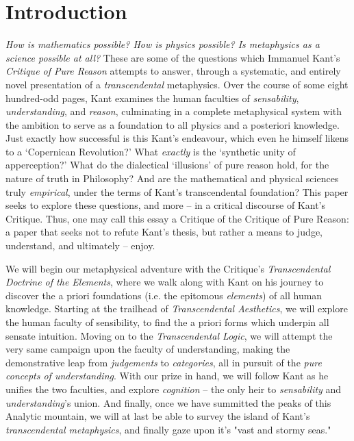 \section*{Introduction}
\emph{How is mathematics possible? How is physics possible? Is metaphysics as a science possible at all?} These are some of the questions which Immanuel Kant's \emph{Critique of Pure Reason} attempts to answer, through a systematic, and entirely novel presentation of a \emph{transcendental} metaphysics. Over the course of some eight hundred-odd pages, Kant examines the human faculties of \emph{sensability}, \emph{understanding}, and \emph{reason}, culminating in a complete metaphysical system with the ambition to serve as a foundation to all physics and a posteriori knowledge. Just exactly how successful is this Kant's endeavour, which even he himself likens to a `Copernican Revolution?' What \emph{exactly} is the `synthetic unity of apperception?' What do the dialectical `illusions' of pure reason hold, for the nature of truth in Philosophy? And are the mathematical and physical sciences truly \emph{empirical}, under the terms of Kant's transcendental foundation? This paper seeks to explore these questions, and more -- in a critical discourse of Kant's Critique. Thus, one may call this essay a Critique of the Critique of Pure Reason: a paper that seeks not to refute Kant's thesis, but rather a means to judge, understand, and ultimately -- enjoy.

We will begin our metaphysical adventure with the Critique's \emph{Transcendental Doctrine of the Elements}, where we walk along with Kant on his journey to discover the a priori foundations (i.e. the epitomous \emph{elements}) of all human knowledge. Starting at the trailhead of \emph{Transcendental Aesthetics}, we will explore the human faculty of sensibility, to find the a priori forms which underpin all sensate intuition. Moving on to the \emph{Transcendental Logic}, we will attempt the very same campaign upon the faculty of understanding, making the demonstrative leap from \emph{judgements} to \emph{categories}, all in pursuit of the \emph{pure concepts of understanding}. With our prize in hand, we will follow Kant as he unifies the two faculties, and explore \emph{cognition} -- the only heir to \emph{sensability} and \emph{understanding}'s union. And finally, once we have summitted the peaks of this Analytic mountain, we will at last be able to survey the island of Kant's \emph{transcendental metaphysics}, and finally gaze upon it's "vast and stormy seas."
